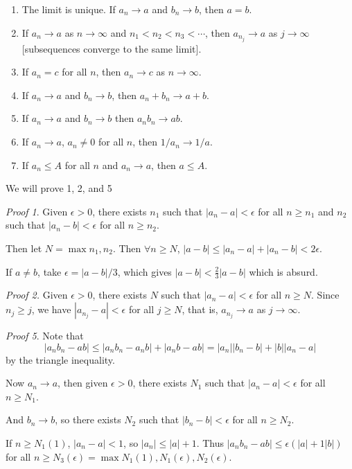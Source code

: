 \documentclass[a4paper]{scrreprt}
\begin{document}
\begin{enumerate}
	\item The limit is unique. If $a_n \rightarrow a$ and $b_n \rightarrow b$, then $a = b$.
	\item If $a_n \rightarrow a$ as $n \rightarrow \infty$ and $n_1 < n_2 < n_3 < \cdots$, then $a_{n_j} \rightarrow a$ as $j \rightarrow \infty$ [subsequences converge to the same limit].
	\item If $a_n = c$ for all $n$, then $a_n \rightarrow c$ as $n \rightarrow \infty$.
	\item If $a_n \rightarrow a$ and $b_n \rightarrow b$, then $a_n + b_n \rightarrow a + b$.
	\item If $a_n \rightarrow a$ and $b_n \rightarrow b$ then $a_n b_n \rightarrow ab$.
	\item If $a_n \rightarrow a$, $a_n \neq 0$ for all $n$, then $1/a_n \rightarrow 1/a$.
	\item If $a_n \leq A$ for all $n$ and $a_n \rightarrow a$, then $a \leq A$.
\end{enumerate}

We will prove 1, 2, and 5

\emph{Proof 1}. Given $\epsilon > 0$, there exists $n_1$ such that $|a_n - a| < \epsilon$ for all $n \geq n_1$ and $n_2$ such that $|a_n - b| < \epsilon$ for all $n \geq n_2$.

Then let $N = \max{n_1, n_2}$. Then $\forall n \geq N$, $|a - b| \leq |a_n - a| + |a_n - b| < 2 \epsilon$.

If $a \neq b$, take $\epsilon = |a - b| /3$, which gives $|a - b| < \frac{2}{3}|a - b|$ which is absurd.

\emph{Proof 2.} Given $\epsilon > 0$, there exists $N$ such that $|a_n - a| < \epsilon$ for all $n \geq N$. Since $n_j \geq j$, we have $|a_{n_j} - a| < \epsilon$ for all $j \geq N$, that is, $a_{n_j} \rightarrow a$ as $j \rightarrow \infty$.

\emph{Proof 5}. Note that
$$
|a_n b_n - ab| \leq |a_n b_n - a_n b| + |a_n b - ab| = |a_n||b_n - b| + |b||a_n - a|
$$
by the triangle inequality.

Now $a_n \rightarrow a$, then given $\epsilon > 0$, there exists $N_1$ such that $|a_n - a| < \epsilon$ for all $n \geq N_1$.

And $b_n \rightarrow b$, so there exists $N_2$ such that $|b_n - b| < \epsilon$ for all $n \geq N_2$.

If $n \geq N_1(1)$, $|a_n - a| < 1$, so $|a_n| \leq |a| + 1$.
Thus $|a_n b_n - ab| \leq \epsilon(|a| + 1 | b|)$ for all $n \geq N_3(\epsilon) = \max{N_1(1), N_1(\epsilon), N_2(\epsilon)}$.
\end{document}
